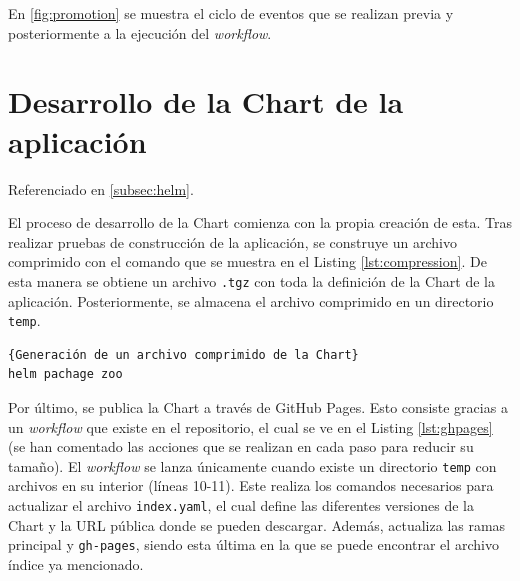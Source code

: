 En \ref{fig:promotion} se muestra el ciclo de eventos que se realizan previa y posteriormente a la ejecución del \textit{workflow}.


\section{Desarrollo de la Chart de la aplicación}
\label{sec:chart}

Referenciado en \ref{subsec:helm}.

El proceso de desarrollo de la Chart comienza con la propia creación de esta. Tras realizar pruebas de construcción de la aplicación, se construye un archivo comprimido con el comando que se muestra en el Listing \ref{lst:compression}. De esta manera se obtiene un archivo \texttt{.tgz} con toda la definición de la Chart de la aplicación. Posteriormente, se almacena el archivo comprimido en un directorio \texttt{temp}.

\begin{lstlisting}[language=bash,label=lst:compression]{Generación de un archivo comprimido de la Chart}
helm pachage zoo
\end{lstlisting}

Por último, se publica la Chart a través de GitHub Pages. Esto consiste gracias a un \textit{workflow} que existe en el repositorio, el cual se ve en el Listing \ref{lst:ghpages} (se han comentado las acciones que se realizan en cada paso para reducir su tamaño). El \textit{workflow} se lanza únicamente cuando existe un directorio \texttt{temp} con archivos en su interior (líneas 10-11). Este realiza los comandos necesarios para actualizar el archivo \texttt{index.yaml}, el cual define las diferentes versiones de la Chart y la URL pública donde se pueden descargar. Además, actualiza las ramas principal y \texttt{gh-pages}, siendo esta última en la que se puede encontrar el archivo índice ya mencionado.

